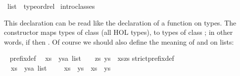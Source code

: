 %
\begin{isabellebody}%
\def\isabellecontext{Overloading}%
%
\isadelimtheory
%
\endisadelimtheory
%
\isatagtheory
%
\endisatagtheory
{\isafoldtheory}%
%
\isadelimtheory
%
\endisadelimtheory
{}\isamarkupfalse%
\ list\ {\isacharcolon}{\isacharcolon}\ {\isacharparenleft}type{\isacharparenright}ordrel\isanewline
%
\isadelimproof
%
\endisadelimproof
%
\isatagproof
{}\isamarkupfalse%
\ intro{\isacharunderscore}classes%
\endisatagproof
{\isafoldproof}%
%
\isadelimproof
%
\endisadelimproof
%
\begin{isamarkuptext}%
\noindent
This  declaration can be read like the declaration of
a function on types.  The constructor  maps types of class  (all HOL types), to types of class ;
in other words,
if  then .
Of course we should also define the meaning of \isa{{\isacharless}{\isacharless}{\isacharequal}} and
\isa{{\isacharless}{\isacharless}} on lists:%
\end{isamarkuptext}%
\isamarkuptrue%
\isamarkupfalse%
\ {\isacharparenleft}\isanewline
prefix{\isacharunderscore}def{\isacharcolon}\isanewline
\ \ {\isachardoublequoteopen}xs\ {\isacharless}{\isacharless}{\isacharequal}\ {\isacharparenleft}ys{\isacharcolon}{\isacharcolon}{\isacharprime}a\ list{\isacharparenright}\ \ {\isasymequiv}\ \ {\isasymexists}zs{\isachardot}\ ys\ {\isacharequal}\ xs{\isacharat}zs{\isachardoublequoteclose}\isanewline
strict{\isacharunderscore}prefix{\isacharunderscore}def{\isacharcolon}\isanewline
\ \ {\isachardoublequoteopen}xs\ {\isacharless}{\isacharless}\ {\isacharparenleft}ys{\isacharcolon}{\isacharcolon}{\isacharprime}a\ list{\isacharparenright}\ \ \ {\isasymequiv}\ \ xs\ {\isacharless}{\isacharless}{\isacharequal}\ ys\ {\isasymand}\ xs\ {\isasymnoteq}\ ys{\isachardoublequoteclose}\isanewline
%
\isadelimtheory
%
\endisadelimtheory
%
\isatagtheory
%
\endisatagtheory
{\isafoldtheory}%
%
\isadelimtheory
%
\endisadelimtheory
\end{isabellebody}%
